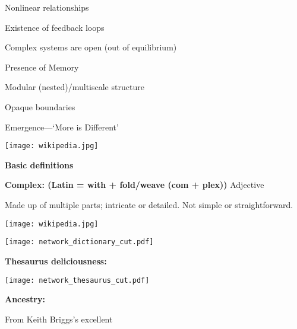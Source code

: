      Nonlinear relationships
    
      Existence of feedback loops
    
      Complex systems are open (out of equilibrium)
    
      Presence of Memory
    
      Modular (nested)/multiscale structure
    
      Opaque boundaries
    
      Emergence---`More is Different'\cite{anderson1972a}
    
  
  \mbox{}
  \hfill
  \texttt{[image: wikipedia.jpg]}


  \textbf{Basic definitions}


  \textbf{{Complex:} (Latin = with + fold/weave (com + plex))}
    \alert{Adjective}
    
     Made up of multiple parts; intricate or detailed.
     Not simple or straightforward.
    
  
\mbox{} \hfill \texttt{[image: wikipedia.jpg]}


  \texttt{[image: network\_dictionary\_cut.pdf]}

  \textbf{Thesaurus deliciousness:}

  \begin{center}
    \texttt{[image: network\_thesaurus\_cut.pdf]}
  \end{center}





  \textbf{Ancestry:}

  From Keith Briggs's excellent

  \medskip

      
    
    
     
